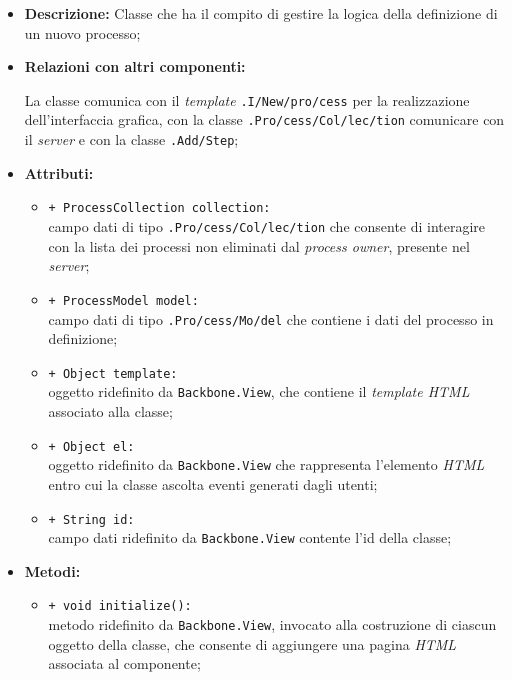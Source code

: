 \begin{flushleft}
\begin{itemize}
\item \textbf{Descrizione:} Classe che ha il compito di gestire la logica della definizione di un nuovo processo;
\item \textbf{Relazioni con altri componenti:}
\begin{sloppypar}
La classe comunica con il \textit{template} \texttt{\viewAdmin{}.I\fshyp{}New\fshyp{}pro\fshyp{}cess} per la realizzazione dell'interfaccia grafica, con la classe \texttt{\collection{}.Pro\fshyp{}cess\fshyp{}Col\fshyp{}lec\fshyp{}tion} comunicare con il \textit{server} e con la classe \texttt{\logicAdmin{}.Add\fshyp{}Step};
\end{sloppypar}
\item \textbf{Attributi:}
\begin{sloppypar}
\begin{itemize}
\item \texttt{+ ProcessCollection collection:}\\ campo dati di tipo \texttt{\collection{}.Pro\fshyp{}cess\fshyp{}Col\fshyp{}lec\fshyp{}tion} che consente di interagire con la lista dei processi non eliminati dal \textit{process owner}, presente nel \textit{server};
\item \texttt{+ ProcessModel model:}\\ campo dati di tipo \texttt{\model{}.Pro\fshyp{}cess\fshyp{}Mo\fshyp{}del} che contiene i dati del processo in definizione;
\item \texttt{+ Object template:}\\ oggetto ridefinito da \texttt{Backbone.View}, che contiene il \textit{template HTML} associato alla classe;
\item \texttt{+ Object el:}\\ oggetto ridefinito da \texttt{Backbone.View} che rappresenta l'elemento \textit{HTML} entro cui la classe ascolta eventi generati dagli utenti;
\item \texttt{+ String id:}\\ campo dati ridefinito da \texttt{Backbone.View} contente l'id della classe;
\end{itemize}
\end{sloppypar}
\item \textbf{Metodi:}
\begin{sloppypar}
\begin{itemize}
\item \texttt{+ void initialize():}\\ metodo ridefinito da \texttt{Backbone.View}, invocato alla costruzione di ciascun oggetto della classe, che consente di aggiungere una pagina \textit{HTML} associata al componente;

\end{itemize}
\end{sloppypar}
\end{itemize}
\end{flushleft}
